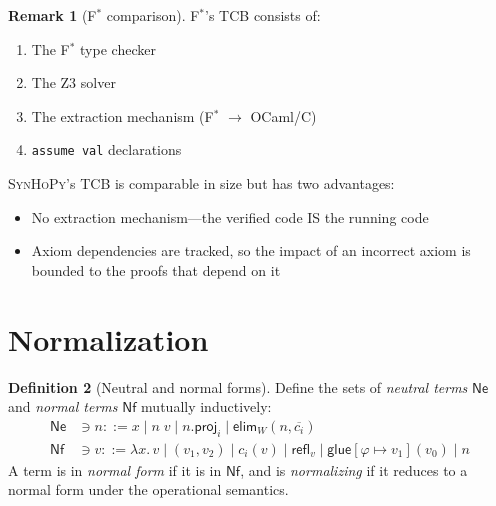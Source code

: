 \documentclass[11pt,a4paper]{report}
\theoremstyle{definition}
\newtheorem{definition}{Definition}[chapter]
\newtheorem{remark}[definition]{Remark}
\theoremstyle{plain}
\newcommand{\Refl}{\mathsf{refl}}
\newcommand{\fstar}{F$^{*}$}
\newcommand{\synhopy}{\textsc{SynHoPy}}
\begin{document}
\begin{remark}[\fstar{} comparison]
\fstar{}'s TCB consists of:
\begin{enumerate}
  \item The \fstar{} type checker
  \item The Z3 solver
  \item The extraction mechanism (F$^*$ $\to$ OCaml/C)
  \item \lstinline[style=fstar]{assume val} declarations
\end{enumerate}
\synhopy{}'s TCB is comparable in size but has two advantages:
\begin{itemize}
  \item No extraction mechanism---the verified code IS the running code
  \item Axiom dependencies are tracked, so the impact of an incorrect axiom
    is bounded to the proofs that depend on it
\end{itemize}
\end{remark}


\section{Normalization}

\begin{definition}[Neutral and normal forms]
\label{def:normal-forms}
Define the sets of \emph{neutral terms} $\mathsf{Ne}$ and \emph{normal terms}
$\mathsf{Nf}$ mutually inductively:
\begin{align}
  \mathsf{Ne} &\ni n ::= x \mid n\;v \mid n.\mathsf{proj}_i
    \mid \mathsf{elim}_W(n, \overline{c_i}) \\
  \mathsf{Nf} &\ni v ::= \lambda x.\, v \mid (v_1, v_2) \mid c_i(v)
    \mid \Refl_v \mid \mathsf{glue}[\varphi \mapsto v_1](v_0)
    \mid n
\end{align}
A term is in \emph{normal form} if it is in $\mathsf{Nf}$, and is
\emph{normalizing} if it reduces to a normal form under the operational
semantics.
\end{definition}
\end{document}
